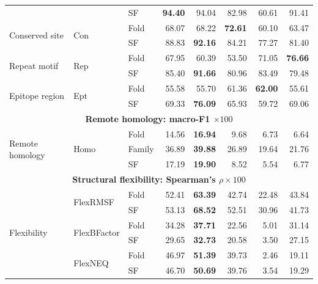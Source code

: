 \begin{table}[p]
\begin{tabular}{@{}lllrrrrr@{}}
& & SF & \textbf{94.40} & 94.04 & 82.98 & 60.61 & 91.41 \\
\multirow{2}{*}{Conserved site}
& \multirow{2}{*}{Con} & Fold & 68.07 & 68.22 & \textbf{72.61} & 60.10 & 63.47 \\
& & SF & 88.83 & \textbf{92.16} & 84.21 & 77.27 & 81.40 \\
\multirow{2}{*}{Repeat motif}
& \multirow{2}{*}{Rep} & Fold & 67.95 & 60.39 & 53.50 & 71.05 & \textbf{76.66} \\
& & SF & 85.40 & \textbf{91.66} & 80.96 & 83.49 & 79.48 \\
\multirow{2}{*}{Epitope region}
& \multirow{2}{*}{Ept} & Fold & 55.58 & 55.70 & 61.36 & \textbf{62.00} & 55.61 \\
& & SF & 69.33 & \textbf{76.09} & 65.93 & 59.72 & 69.06 \\
\midrule
\multicolumn{8}{c}{\textbf{Remote homology: macro-F1 $\times100$}} \\
\midrule
\multirow{3}{*}{Remote homology}
& \multirow{3}{*}{Homo} & Fold & 14.56 & \textbf{16.94} & 9.68 & 6.73 & 6.64 \\
& & Family & 36.89 & \textbf{39.88} & 26.89 & 19.64 & 21.76 \\
& & SF & 17.19 & \textbf{19.90} & 8.52 & 5.54 & 6.77 \\
\midrule
\multicolumn{8}{c}{\textbf{Structural flexibility: Spearman's $\rho\times100$}} \\
\midrule
\multirow{6}{*}{Flexibility}
& \multirow{2}{*}{FlexRMSF} & Fold & 52.41 & \textbf{63.39} & 42.74 & 22.48 & 43.84 \\
& & SF & 53.13 & \textbf{68.52} & 52.51 & 30.96 & 41.73 \\
& \multirow{2}{*}{FlexBFactor} & Fold & 34.28 & \textbf{37.71} & 22.56 & 5.01 & 31.14 \\
& & SF & 29.65 & \textbf{32.73} & 20.58 & 3.50 & 27.15 \\
& \multirow{2}{*}{FlexNEQ} & Fold & 46.97 & \textbf{51.39} & 39.73 & 2.46 & 19.11 \\
& & SF & 46.70 & \textbf{50.69} & 39.76 & 3.54 & 19.29 \\
\bottomrule
\end{tabular}
\end{table}

